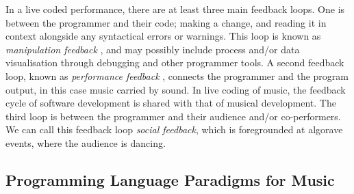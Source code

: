 \documentclass[authoryear,preprint]{sigplanconf}
\begin{document}
In a live coded performance, there are at least three main feedback
loops. One is between the programmer and their code; making a change,
and reading it in context alongside any syntactical errors or
warnings. This loop is known as \emph{manipulation feedback}
\citep{Nash11}, and may possibly include process and/or data
visualisation through debugging and other programmer tools. A second
feedback loop, known as \emph{performance feedback} \citep{Nash11},
connects the programmer and the program output, in this case music
carried by sound. In live coding of music, the feedback cycle of
software development is shared with that of musical development. The
third loop is between the programmer and their audience and/or
co-performers. We can call this feedback loop \emph{social feedback},
which is foregrounded at algorave events, where the audience is
dancing. 



\subsection{Programming Language Paradigms for Music}

\end{document}
